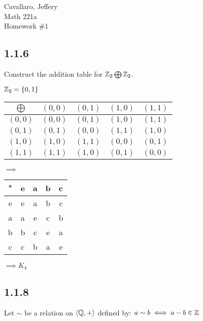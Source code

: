 \documentclass[letterpaper,12pt,fleqn]{article}
\newcommand{\bas}[2]{\left<#1,#2\right>}
\begin{document}
Cavallaro, Jeffery \\
Math 221a \\
Homework \#1

\bigskip

\subsection*{1.1.6}

Construct the addition table for $\mathbb{Z}_2\bigoplus\mathbb{Z}_2$.

\bigskip

$\mathbb{Z}_2=\{0,1\}$

\bigskip

\begin{tabular}{c|cccc}
  $\bigoplus$ & $(0,0)$ & $(0,1)$ & $(1,0)$ & $(1,1)$ \\
  \hline
  $(0,0)$ & $(0,0)$ & $(0,1)$ & $(1,0)$ & $(1,1)$ \\
  $(0,1)$ & $(0,1)$ & $(0,0)$ & $(1,1)$ & $(1,0)$ \\
  $(1,0)$ & $(1,0)$ & $(1,1)$ & $(0,0)$ & $(0,1)$ \\
  $(1,1)$ & $(1,1)$ & $(1,0)$ & $(0,1)$ & $(0,0)$ \\
\end{tabular}
$\implies$
\begin{tabular}{c|cccc}
  $*$ & e & a & b & c \\
  \hline
  e & e & a & b & c \\
  a & a & e & c & b \\
  b & b & c & e & a \\
  c & c & b & a & e \\
\end{tabular}
$\implies K_4$

\subsection*{1.1.8}
Let $\sim$ be a relation on $\bas{\Q}{+}$ defined by: $a\sim b\iff a-b\in\mathbb{Z}$
\end{document}
